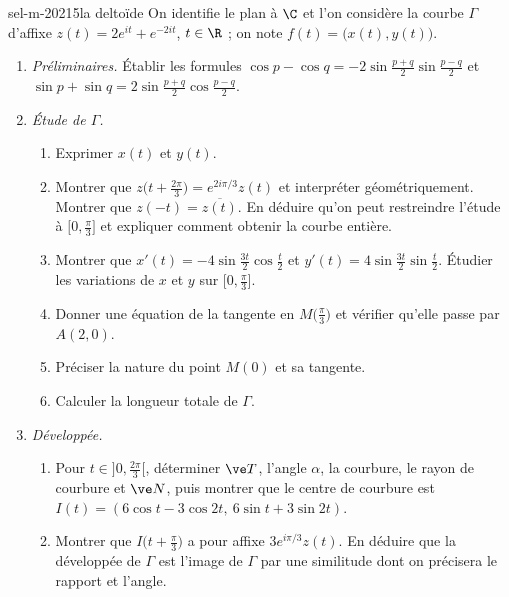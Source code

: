 \begin{exo}{sel-m-2021}{5}{la deltoïde}
On identifie le plan à $\C$ et l'on considère la courbe $\Gamma$ d'affixe $z(t)=2e^{it}+e^{-2it}$, $t\in\R$ ; on note $f(t)=\big(x(t),y(t)\big)$.
\begin{enumerate}
\item \emph{Préliminaires.} Établir les formules $\cos p-\cos q=-2\sin\frac{p+q}2\sin\frac{p-q}2$ et $\sin p+\sin q=2\sin\frac{p+q}2\cos\frac{p-q}2$.
\item \emph{Étude de $\Gamma$.}
\begin{enumerate}
\item Exprimer $x(t)$ et $y(t)$.
\item Montrer que $z\big(t+\frac{2\pi}3\big)=e^{2i\pi/3}z(t)$ et interpréter géométriquement. Montrer que $z(-t)=\overline{z(t)}$. En déduire qu'on peut restreindre l'étude à $\big[0,\frac\pi3\big]$ et expliquer comment obtenir la courbe entière.
\item Montrer que $x'(t)=-4\sin\frac{3t}2\cos\frac t2$ et $y'(t)=4\sin\frac{3t}2\sin\frac t2$. Étudier les variations de $x$ et $y$ sur $\big[0,\frac\pi3\big]$.
\item Donner une équation de la tangente en $M\big(\frac\pi3\big)$ et vérifier qu'elle passe par $A(2,0)$.
\item Préciser la nature du point $M(0)$ et sa tangente.
\item Calculer la longueur totale de $\Gamma$.
\end{enumerate}
\item \emph{Développée.}
\begin{enumerate}
\item Pour $t\in\big]0,\frac{2\pi}3\big[$, déterminer $\ve T$, l'angle $\alpha$, la courbure, le rayon de courbure et $\ve N$, puis montrer que le centre de courbure est $I(t)=(6\cos t-3\cos2t,\ 6\sin t+3\sin2t)$.
\item Montrer que $I\big(t+\frac\pi3\big)$ a pour affixe $3e^{i\pi/3}z(t)$. En déduire que la développée de $\Gamma$ est l'image de $\Gamma$ par une similitude dont on précisera le rapport et l'angle.
\end{enumerate}
\end{enumerate}
\end{exo}

